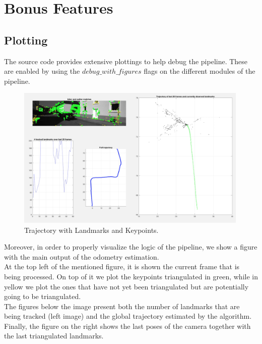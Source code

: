 \section{Bonus Features}
\label{s:BF}

\subsection{Plotting}
The source code provides extensive plottings to help debug the pipeline. These are enabled by using the $debug\_with\_figures$ flags
on the different modules of the pipeline. \\

\begin{figure}
\includegraphics[width=0.99\textwidth]{files/titus_plot.png}
\caption[Trajectory with Landmarks and Keypoints]{\label{fig:titus_plot}Trajectory with Landmarks and Keypoints.}
\end{figure}

Moreover, in order to properly visualize the logic of the pipeline, we show a figure with the main output of the odometry estimation. \\
At the top left of the mentioned figure, it is shown the current frame that is being processed. On top of it we plot the keypoints
triangulated in green, while in yellow we plot the ones that have not yet been triangulated but are potentially going to be
triangulated. \\
The figures below the image present both the number of landmarks that are being tracked (left image) and the global trajectory
estimated by the algorithm. \\
Finally, the figure on the right shows the last poses of the camera together with the last triangulated landmarks.


